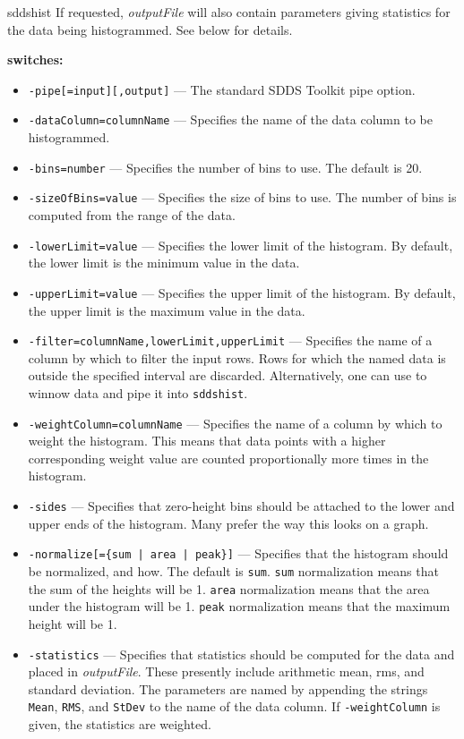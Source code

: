 \begin{sddsprog}{sddshist}
    If requested, \emph{outputFile} will also contain parameters giving statistics for the data being histogrammed. See below for details.
  \item \textbf{switches:}
    \begin{itemize}
      \item \verb|-pipe[=input][,output]| --- The standard SDDS Toolkit pipe option.
      \item \verb|-dataColumn=columnName| --- Specifies the name of the data column to be histogrammed.
      \item \verb|-bins=number| --- Specifies the number of bins to use. The default is 20.
      \item \verb|-sizeOfBins=value| --- Specifies the size of bins to use. The number of bins is computed from the range of the data.
      \item \verb|-lowerLimit=value| --- Specifies the lower limit of the histogram. By default, the lower limit is the minimum value in the data.
      \item \verb|-upperLimit=value| --- Specifies the upper limit of the histogram. By default, the upper limit is the maximum value in the data.
      \item \verb|-filter=columnName,lowerLimit,upperLimit| --- Specifies the name of a column by which to filter the input rows. Rows for which the named data is outside the specified interval are discarded. Alternatively, one can use  to winnow data and pipe it into \verb|sddshist|.
      \item \verb|-weightColumn=columnName| --- Specifies the name of a column by which to weight the histogram. This means that data points with a higher corresponding weight value are counted proportionally more times in the histogram.
      \item \verb|-sides| --- Specifies that zero-height bins should be attached to the lower and upper ends of the histogram. Many prefer the way this looks on a graph.
      \item \verb!-normalize[={sum | area | peak}]! --- Specifies that the histogram should be normalized, and how. The default is \verb|sum|. \verb|sum| normalization means that the sum of the heights will be 1. \verb|area| normalization means that the area under the histogram will be 1. \verb|peak| normalization means that the maximum height will be 1.
      \item \verb|-statistics| --- Specifies that statistics should be computed for the data and placed in \emph{outputFile}. These presently include arithmetic mean, rms, and standard deviation. The parameters are named by appending the strings \verb|Mean|, \verb|RMS|, and \verb|StDev| to the name of the data column. If \verb|-weightColumn| is given, the statistics are weighted.

\end{itemize}
\end{sddsprog}
